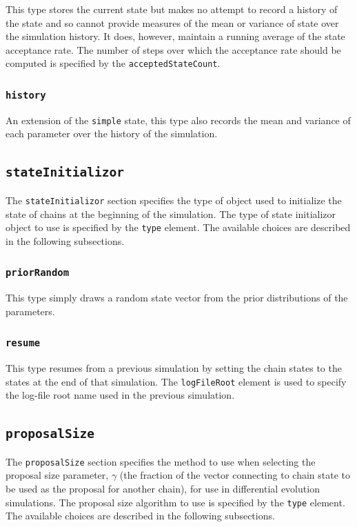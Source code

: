 This type stores the current state but makes no attempt to record a history of the state and so cannot provide measures of the mean or variance of state over the simulation history. It does, however, maintain a running average of the state acceptance rate. The number of steps over which the acceptance rate should be computed is specified by the {\tt acceptedStateCount}.

\subsubsection{{\tt history}}

An extension of the {\tt simple} state, this type also records the mean and variance of each parameter over the history of the simulation.

\subsection{{\tt stateInitializor}}

The {\tt stateInitializor} section specifies the type of object used to initialize the state of chains at the beginning of the simulation. The type of state initializor object to use is specified by the {\tt type} element. The available choices are described in the following subsections.

\subsubsection{{\tt priorRandom}}

This type simply draws a random state vector from the prior distributions of the parameters.

\subsubsection{{\tt resume}}

This type resumes from a previous simulation by setting the chain states to the states at the end of that simulation. The {\tt logFileRoot} element is used to specify the log-file root name used in the previous simulation.

\subsection{{\tt proposalSize}}

The {\tt proposalSize} section specifies the method to use when selecting the proposal size parameter, $\gamma$ (the fraction of the vector connecting to chain state to be used as the proposal for another chain), for use in differential evolution simulations. The proposal size algorithm to use is specified by the {\tt type} element. The available choices are described in the following subsections.


